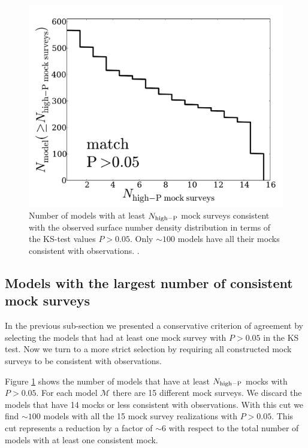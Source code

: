 \documentclass[usenatbib]{mn2e}
\begin{document}
\begin{figure}
\begin{center}
\includegraphics[width=0.95\linewidth,angle=0]{Fig4_match_P5.pdf}
\end{center} 
\caption{ Number of models with at least $N_{\rm high-P}$ mock surveys
  consistent with the observed surface number density
  distribution in terms of the KS-test values $P>0.05$. Only $\sim
  100$ models have all their mocks consistent with observations. 
  \label{fig:high_success_rate}.}  
\end{figure}
 
\subsection{Models with the largest number of consistent mock surveys}

In the previous sub-section we presented a conservative criterion of
agreement by selecting the models that had at least one mock survey
with $P>0.05$ in the KS test. Now we turn to a more strict selection
by requiring all constructed mock surveys to be consistent with
observations. 


Figure \ref{fig:high_success_rate} shows the number of models
that have at least $N_{\rm high-P}$ mocks with $P>0.05$. For each
model ${\mathcal M}$ there are 15 different mock surveys.  We discard
the models that have 14 mocks or less consistent with
observations. With this cut we find $\sim 100$ models with all the 15
mock survey realizations with $P>0.05$.  This cut represents a
reduction by a factor of $\sim 6$ with respect to the total number of
models with at least one consistent mock.   
\end{document}
